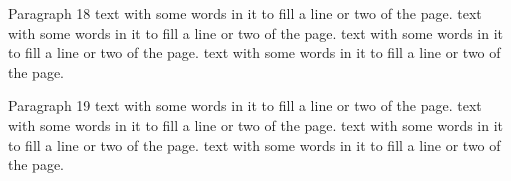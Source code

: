 \documentclass{article}
\begin{document}
Paragraph 18 text with some words in it to fill a line or two of the page. text with some words in it to fill a line or two of the page. text with some words in it to fill a line or two of the page. text with some words in it to fill a line or two of the page. 

Paragraph 19 text with some words in it to fill a line or two of the page. text with some words in it to fill a line or two of the page. text with some words in it to fill a line or two of the page. text with some words in it to fill a line or two of the page. 
\end{document}

